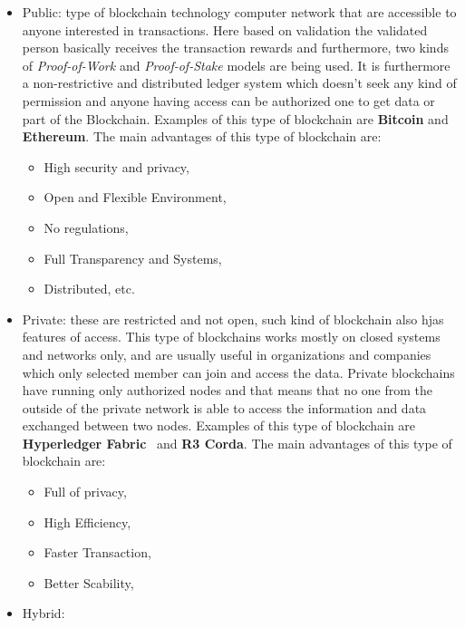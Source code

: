 \begin{itemize}
    \item {Public}: type of blockchain technology computer network that are accessible to anyone interested in transactions. Here based on validation the validated
          person basically receives the transaction rewards and furthermore, two kinds of \textit{Proof-of-Work} and \textit{Proof-of-Stake} models are being used.
          It is furthermore a non-restrictive and distributed ledger system which doesn't seek any kind of permission and anyone having access can be authorized one to get
          data or part of the Blockchain. Examples of this type of blockchain are \textbf{Bitcoin} and \textbf{Ethereum}. The main advantages of this type of blockchain are:
          \begin{itemize}
              \item High security and privacy,
              \item Open and Flexible Environment,
              \item No regulations,
              \item Full Transparency and Systems,
              \item Distributed, etc.
          \end{itemize}

    \item {Private}: these are restricted and not open, such kind of blockchain also hjas features of access. This type of blockchains works mostly on closed systems and networks only, and are usually
          useful in organizations and companies which only selected member can join and access the data. Private blockchains have running only authorized nodes and that means that no one from the outside
          of the private network is able to access the information and data exchanged between two nodes. Examples of this type of blockchain are \textbf{Hyperledger Fabric}~\cite{hyperLedger} and \textbf{R3 Corda}.
          The main advantages of this type of blockchain are:
          \begin{itemize}
              \item Full of privacy,
              \item High Efficiency,
              \item Faster Transaction,
              \item Better Scability,
          \end{itemize}

    \item {Hybrid}:
\end{itemize}

